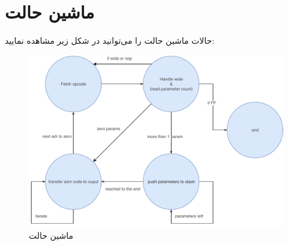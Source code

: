 \section*{
ماشین حالت
}
حالات ماشین حالت را می‌توانید در شکل زیر مشاهده نمایید:
\begin{figure}[H]
	\centering
	\includegraphics[width=0.9\linewidth]{SM}
	\caption{ماشین حالت}
	\label{fig:sm}
\end{figure}
